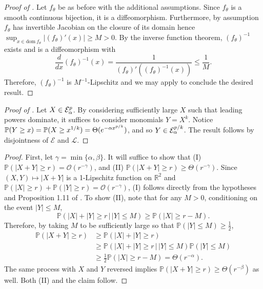\documentclass[thesis.tex]{subfiles}
\begin{document}
\begin{proof}[Proof of ]
    Let $f_\theta$ be as before with the additional assumptions.
    Since $f_\theta$ is a smooth continuous bijection, it is a diffeomorphism.
    Furthermore, by assumption $f_\theta$ has invertible Jacobian on the closure of its
    domain hence $\sup_{x \in \text{dom}~f_\theta} \lvert (f_\theta)'(x) \rvert \geq M > 0$.
    By the inverse function theorem, $(f_\theta)^{-1}$ exists and is
    a diffeomorphism with
    \[
    \frac{d}{dx}(f_\theta)^{-1}(x) = \frac{1}{(f_\theta)'((f_\theta)^{-1}(x))} \leq \frac{1}{M} .
    \]
    Therefore, $(f_\theta)^{-1}$ is $M^{-1}$-Lipschitz and we may apply
     to conclude the desired result.
\end{proof}

\begin{proof}[Proof of ]
  Let $X \in \mathcal{E}^p_\alpha$.
  By considering sufficiently large $X$ such that leading powers dominate, it suffices to consider monomials $Y = X^k$.
  Notice $\mathbb{P}(Y \geq x) = \mathbb{P}(X \geq x^{1/k}) = \Theta(e^{-\alpha x^{p/k}})$, and so
  $Y \in \mathcal{E}^{p/k}_\alpha$. The result follows by disjointness of $\mathcal{E}$ and $\mathcal{L}$. 
\end{proof}


\begin{proof}
First, let $\gamma=\min\{\alpha,\beta\}$. It will suffice to show that (I) $\mathbb{P}(|X+Y|\geq r)=\mathcal{O}(r^{-\gamma})$, and (II) $\mathbb{P}(|X+Y|\geq r)\geq\Theta(r^{-\gamma})$. Since $(X,Y)\mapsto|X+Y|$ is a 1-Lipschitz function on $\mathbb{R}^{2}$ and $\mathbb{P}(|X|\geq r)+\mathbb{P}(|Y|\geq r)=\mathcal{O}(r^{-\gamma})$, (I) follows directly from the hypotheses and Proposition 1.11 of \citet{ledoux2001concentration}. To show (II), note that for any $M>0$, conditioning on the event $|Y|\leq M$,\[
\mathbb{P}\left(\left|X\right|+|Y|\geq r\,\vert\,|Y|\leq M\right)\geq\mathbb{P}\left(\left|X\right|\geq r-M\right).
\]
Therefore, by taking $M$ to be sufficiently large so that $\mathbb{P}(|Y|\leq M)\geq\frac{1}{2}$,
\begin{align*}
\mathbb{P}\left(|X+Y|\geq r\right)&\geq\mathbb{P}\left(|X|+|Y|\geq r\right)\\
&\geq\mathbb{P}\left(\left|X\right|+|Y|\geq r\,\vert\,|Y|\leq M\right)\mathbb{P}\left(\left|Y\right|\leq M\right)\\
&\geq\frac{1}{2}\mathbb{P}\left(\left|X\right|\geq r-M\right)=\Theta(r^{-\alpha}).
\end{align*}
The same process with $X$ and $Y$ reversed implies $\mathbb{P}(|X+Y|\geq r)\geq\Theta(r^{-\beta})$ as well. Both (II) and the claim follow.
\end{proof}
\end{document}
